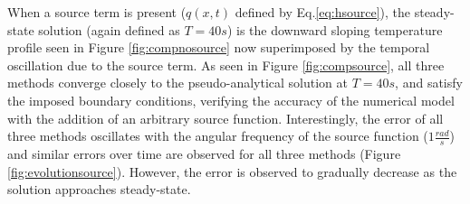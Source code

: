 \documentclass[10pt, letter, showtrims]{extarticle}
\begin{document}
		\noindent
		When a source term is present ($q(x,t)$ defined by Eq.\ref{eq:hsource}), the steady-state solution (again defined as $T = 40s$) is the downward sloping temperature profile seen in Figure \ref{fig:compnosource} now superimposed by the temporal oscillation due to the source term. As seen in Figure \ref{fig:compsource}, all three methods converge closely to the pseudo-analytical solution at $T = 40 s$, and satisfy the imposed boundary conditions, verifying the accuracy of the numerical model with the addition of an arbitrary source function. Interestingly, the error of all three methods oscillates with the angular frequency of the source function ($1 \frac{rad}{s}$) and similar errors over time are observed for all three methods (Figure \ref{fig:evolutionsource}). However, the error is observed to gradually decrease as the solution approaches steady-state.
			
\end{document}
